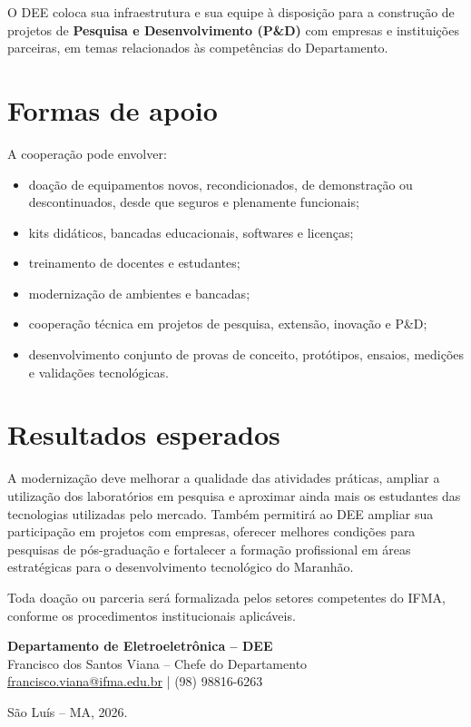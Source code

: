 \documentclass[12pt,a4paper]{article}
\begin{document}
O DEE coloca sua infraestrutura e sua equipe à disposição para a construção de projetos de \textbf{Pesquisa e Desenvolvimento (P\&D)} com empresas e instituições parceiras, em temas relacionados às competências do Departamento.

\section{Formas de apoio}
A cooperação pode envolver:
\begin{itemize}[leftmargin=*]
\item doação de equipamentos novos, recondicionados, de demonstração ou descontinuados, desde que seguros e plenamente funcionais;
\item kits didáticos, bancadas educacionais, softwares e licenças;
\item treinamento de docentes e estudantes;
\item modernização de ambientes e bancadas;
\item cooperação técnica em projetos de pesquisa, extensão, inovação e P\&D;
\item desenvolvimento conjunto de provas de conceito, protótipos, ensaios, medições e validações tecnológicas.
\end{itemize}

\section{Resultados esperados}
A modernização deve melhorar a qualidade das atividades práticas, ampliar a utilização dos laboratórios em pesquisa e aproximar ainda mais os estudantes das tecnologias utilizadas pelo mercado. Também permitirá ao DEE ampliar sua participação em projetos com empresas, oferecer melhores condições para pesquisas de pós-graduação e fortalecer a formação profissional em áreas estratégicas para o desenvolvimento tecnológico do Maranhão.

Toda doação ou parceria será formalizada pelos setores competentes do IFMA, conforme os procedimentos institucionais aplicáveis.

\begin{destaque}
\textbf{Departamento de Eletroeletrônica -- DEE}\\
Francisco dos Santos Viana -- Chefe do Departamento\\
\href{mailto:francisco.viana@ifma.edu.br}{francisco.viana@ifma.edu.br} \quad | \quad (98) 98816-6263
\end{destaque}

\vfill
\begin{center}
São Luís -- MA, 2026.
\end{center}
\end{document}
